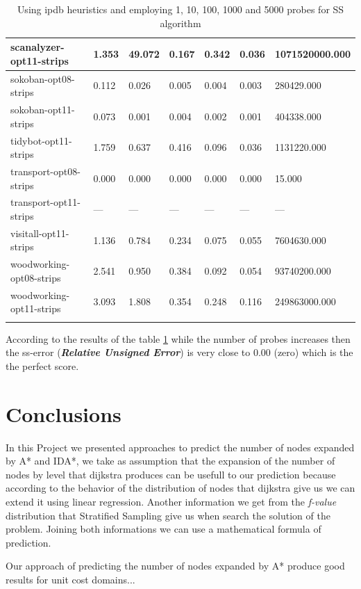 \documentclass[11pt,a4paper,oneside]{report}
\begin{document}
\begin{longtable}{@{\extracolsep{\fill}} lllllll @{}}
scanalyzer-opt11-strips  & 1.353    & 49.072   & 0.167    & 0.342    & 0.036    & 1071520000.000 \\ \hline
sokoban-opt08-strips     & 0.112    & 0.026    & 0.005    & 0.004    & 0.003    & 280429.000     \\ \hline
sokoban-opt11-strips     & 0.073    & 0.001    & 0.004    & 0.002    & 0.001    & 404338.000     \\ \hline
tidybot-opt11-strips     & 1.759    & 0.637    & 0.416    & 0.096    & 0.036    & 1131220.000    \\ \hline
transport-opt08-strips   & 0.000    & 0.000    & 0.000    & 0.000    & 0.000    & 15.000         \\ \hline
transport-opt11-strips   & ---      & ---      & ---      & ---      & ---      & ---            \\ \hline
visitall-opt11-strips    & 1.136    & 0.784    & 0.234    & 0.075    & 0.055    & 7604630.000    \\ \hline
woodworking-opt08-strips & 2.541    & 0.950    & 0.384    & 0.092    & 0.054    & 93740200.000   \\ \hline
woodworking-opt11-strips & 3.093    & 1.808    & 0.354    & 0.248    & 0.116    & 249863000.000  \\ \hline
\caption{Using ipdb heuristics and employing 1, 10, 100, 1000 and 5000 probes for SS algorithm}
\label{table:comparison2}
\end{longtable}

According to the results of the table \ref{table:comparison2} while the number of probes increases then the ss-error (\textit{\textbf{Relative Unsigned Error}}) is very close to 0.00 (zero) which is the the perfect score.

\section{Conclusions}
In this Project we presented approaches to predict the number of nodes expanded by A* and  IDA*, we take as assumption that the expansion of the number of nodes by level that dijkstra produces can be usefull to our prediction because according to the behavior of the distribution of nodes that dijkstra give us we can extend it using linear regression. Another information we get from the \textit{f-value} distribution that Stratified Sampling give us when search the solution of the problem. Joining both informations we can use a mathematical formula of prediction.\newline

Our approach of predicting the number of nodes expanded by A* produce good results for unit cost domains...  
\newpage

%
\end{document}
